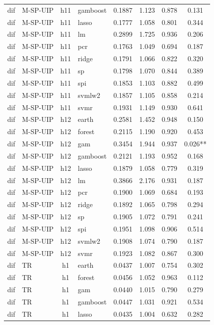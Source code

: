 \begin{ThreePartTable}
\begin{longtable}[t]{llclcccc}
dif & M-SP-UIP & h11 & gamboost & 0.1887 & 1.123 & 0.878 & 0.131\\
dif & M-SP-UIP & h11 & lasso & 0.1777 & 1.058 & 0.801 & 0.344\\
dif & M-SP-UIP & h11 & lm & 0.2899 & 1.725 & 0.936 & 0.206\\
dif & M-SP-UIP & h11 & pcr & 0.1763 & 1.049 & 0.694 & 0.187\\
dif & M-SP-UIP & h11 & ridge & 0.1791 & 1.066 & 0.822 & 0.320\\
dif & M-SP-UIP & h11 & sp & 0.1798 & 1.070 & 0.844 & 0.389\\
dif & M-SP-UIP & h11 & spi & 0.1853 & 1.103 & 0.882 & 0.499\\
dif & M-SP-UIP & h11 & svmlw2 & 0.1857 & 1.105 & 0.858 & 0.214\\
dif & M-SP-UIP & h11 & svmr & 0.1931 & 1.149 & 0.930 & 0.641\\
\addlinespace
dif & M-SP-UIP & h12 & earth & 0.2581 & 1.452 & 0.948 & 0.150\\
dif & M-SP-UIP & h12 & forest & 0.2115 & 1.190 & 0.920 & 0.453\\
dif & M-SP-UIP & h12 & gam & 0.3454 & 1.944 & 0.937 & 0.026**\\
dif & M-SP-UIP & h12 & gamboost & 0.2121 & 1.193 & 0.952 & 0.168\\
dif & M-SP-UIP & h12 & lasso & 0.1879 & 1.058 & 0.779 & 0.319\\
dif & M-SP-UIP & h12 & lm & 0.3866 & 2.176 & 0.931 & 0.187\\
dif & M-SP-UIP & h12 & pcr & 0.1900 & 1.069 & 0.684 & 0.193\\
dif & M-SP-UIP & h12 & ridge & 0.1892 & 1.065 & 0.798 & 0.294\\
dif & M-SP-UIP & h12 & sp & 0.1905 & 1.072 & 0.791 & 0.241\\
dif & M-SP-UIP & h12 & spi & 0.1951 & 1.098 & 0.906 & 0.514\\
dif & M-SP-UIP & h12 & svmlw2 & 0.1908 & 1.074 & 0.790 & 0.187\\
dif & M-SP-UIP & h12 & svmr & 0.1923 & 1.082 & 0.867 & 0.300\\
\addlinespace
dif & TR & h1 & earth & 0.0437 & 1.007 & 0.754 & 0.302\\
dif & TR & h1 & forest & 0.0456 & 1.052 & 0.963 & 0.112\\
dif & TR & h1 & gam & 0.0440 & 1.015 & 0.790 & 0.279\\
dif & TR & h1 & gamboost & 0.0447 & 1.031 & 0.921 & 0.534\\
dif & TR & h1 & lasso & 0.0435 & 1.004 & 0.632 & 0.282\\

\end{longtable}
\end{ThreePartTable}
